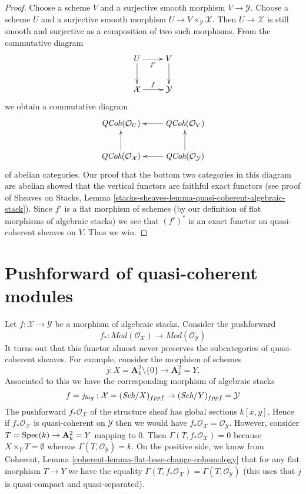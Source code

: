 \begin{proof}
Choose a scheme $V$ and a surjective smooth morphism $V \to \mathcal{Y}$.
Choose a scheme $U$ and a surjective smooth morphism
$U \to V \times_\mathcal{Y} \mathcal{X}$. Then $U \to \mathcal{X}$ is
still smooth and surjective as a composition of two such morphisms.
From the commutative diagram
$$
\xymatrix{
U \ar[d] \ar[r]_{f'} & V \ar[d] \\
\mathcal{X} \ar[r]^f & \mathcal{Y}
}
$$
we obtain a commutative diagram
$$
\xymatrix{
\textit{QCoh}(\mathcal{O}_U) & \textit{QCoh}(\mathcal{O}_V) \ar[l] \\
\textit{QCoh}(\mathcal{O}_\mathcal{X}) \ar[u] &
\textit{QCoh}(\mathcal{O}_\mathcal{Y}) \ar[l] \ar[u]
}
$$
of abelian categories. Our proof that the bottom two categories in this
diagram are abelian showed that the vertical functors are faithful
exact functors (see proof of
Sheaves on Stacks, Lemma
\ref{stacks-sheaves-lemma-quasi-coherent-algebraic-stack}).
Since $f'$ is a flat morphism of schemes (by our definition of
flat morphisms of algebraic stacks) we see that $(f')^*$ is an
exact functor on quasi-coherent sheaves on $V$. Thus we win.
\end{proof}


\section{Pushforward of quasi-coherent modules}
\label{section-pushforward-quasi-coherent}

\noindent
Let $f : \mathcal{X} \to \mathcal{Y}$ be a morphism of algebraic stacks.
Consider the pushforward
$$
f_* :
\textit{Mod}(\mathcal{O}_\mathcal{X})
\longrightarrow
\textit{Mod}(\mathcal{O}_\mathcal{Y})
$$
It turns out that this functor almost never preserves the subcategories
of quasi-coherent sheaves. For example, consider the morphism of schemes
$$
j : X = \mathbf{A}^2_k \setminus \{0\} \longrightarrow \mathbf{A}^2_k = Y.
$$
Associated to this we have the corresponding morphism of algebraic stacks
$$
f = j_{big} : \mathcal{X} = (\textit{Sch}/X)_{fppf} \to
(\textit{Sch}/Y)_{fppf} = \mathcal{Y}
$$
The pushforward $f_*\mathcal{O}_\mathcal{X}$ of the structure sheaf has
global sections $k[x, y]$. Hence if $f_*\mathcal{O}_\mathcal{X}$ is
quasi-coherent on $\mathcal{Y}$ then we would have
$f_*\mathcal{O}_\mathcal{X} = \mathcal{O}_\mathcal{Y}$. However,
consider $T = \mathop{\rm Spec}(k) \to \mathbf{A}^2_k = Y$ mapping to $0$.
Then $\Gamma(T, f_*\mathcal{O}_\mathcal{X}) = 0$ because
$X \times_Y T = \emptyset$ whereas $\Gamma(T, \mathcal{O}_\mathcal{Y}) = k$.
On the positive side, we know from
Coherent, Lemma \ref{coherent-lemma-flat-base-change-cohomology}
that for any flat morphism $T \to Y$ we have the equality
$\Gamma(T, f_*\mathcal{O}_\mathcal{X}) = \Gamma(T, \mathcal{O}_\mathcal{Y})$
(this uses that $j$ is quasi-compact and quasi-separated).


